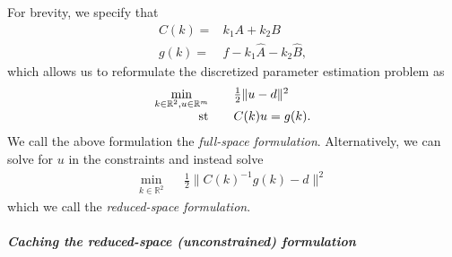 \documentclass{report}
\newcommand{\re}{\mathbb{R}}
\newcommand{\st}{\textnormal{st}}
\begin{document}
For brevity, we specify that
\begin{align*}
    C(k) =& k_1 A + k_2 B\\
    g(k) =& f-k_1\hat{A}-k_2\hat{B},
\end{align*}
which allows us to reformulate the discretized parameter estimation problem as
$$\begin{array}{rcl}
        \min\limits_{k\in\re^2,u\in\re^m}  && \frac{1}{2} \| u - d \|^2 \\
        \st && C(k)u = g(k).
\end{array}$$
We call the above formulation the \textit{full-space formulation}.  Alternatively, we can solve for $u$ in the constraints and instead solve
$$\begin{array}{rcl}
        \min\limits_{k\in\re^2}  && \frac{1}{2} \| C(k)^{-1}g(k) - d \|^2
\end{array}$$
which we call the \textit{reduced-space formulation}.

\subparagraph{Caching the reduced-space (unconstrained) formulation}\mbox{}\\
\end{document}
